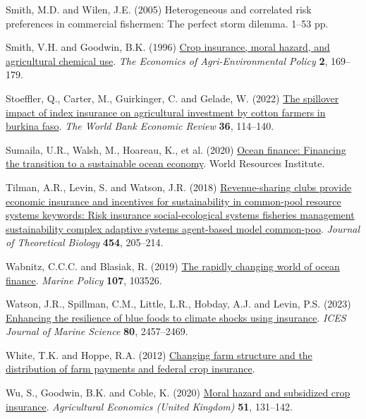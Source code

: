 \documentclass[
  letterpaper,
  DIV=11,
  numbers=noendperiod]{scrartcl}
\newlength{\cslhangindent}
\newenvironment{CSLReferences}[2] %
 {\begin{list}{}{%
  \setlength{\itemindent}{0pt}
  \setlength{\leftmargin}{0pt}
  \setlength{\parsep}{0pt}
  \ifodd #1
   \setlength{\leftmargin}{\cslhangindent}
   \setlength{\itemindent}{-1\cslhangindent}
  \fi
  \setlength{\itemsep}{#2\baselineskip}}}
 {\end{list}}
\theoremstyle{plain}
\theoremstyle{plain}
\theoremstyle{remark}
\begin{document}
\begin{CSLReferences}{1}{0}
Smith, M.D. and Wilen, J.E. (2005) Heterogeneous and correlated risk
preferences in commercial fishermen: The perfect storm dilemma. 1--53
pp.

Smith, V.H. and Goodwin, B.K. (1996)
\href{https://doi.org/10.2307/1243714}{Crop insurance, moral hazard, and
agricultural chemical use}. \emph{The Economics of Agri-Environmental
Policy} \textbf{2}, 169--179.

Stoeffler, Q., Carter, M., Guirkinger, C. and Gelade, W. (2022)
\href{https://doi.org/10.1093/wber}{The spillover impact of index
insurance on agricultural investment by cotton farmers in burkina faso}.
\emph{The World Bank Economic Review} \textbf{36}, 114--140.

Sumaila, U.R., Walsh, M., Hoareau, K., et al. (2020)
\href{https://www.oceanpanel.org/blue-}{Ocean finance: Financing the
transition to a sustainable ocean economy}. World Resources Institute.

Tilman, A.R., Levin, S. and Watson, J.R. (2018)
\href{https://doi.org/10.1016/j.jtbi.2018.06.003}{Revenue-sharing clubs
provide economic insurance and incentives for sustainability in
common-pool resource systems keywords: Risk insurance social-ecological
systems fisheries management sustainability complex adaptive systems
agent-based model common-poo}. \emph{Journal of Theoretical Biology}
\textbf{454}, 205--214.

Wabnitz, C.C.C. and Blasiak, R. (2019)
\href{https://doi.org/10.1016/j.marpol.2019.103526}{The rapidly changing
world of ocean finance}. \emph{Marine Policy} \textbf{107}, 103526.

Watson, J.R., Spillman, C.M., Little, L.R., Hobday, A.J. and Levin, P.S.
(2023) \href{https://doi.org/10.1093/icesjms/fsad175}{Enhancing the
resilience of blue foods to climate shocks using insurance}. \emph{ICES
Journal of Marine Science} \textbf{80}, 2457--2469.

White, T.K. and Hoppe, R.A. (2012)
\href{https://www.ers.usda.gov}{Changing farm structure and the
distribution of farm payments and federal crop insurance}.

Wu, S., Goodwin, B.K. and Coble, K. (2020)
\href{https://doi.org/10.1111/agec.12545}{Moral hazard and subsidized
crop insurance}. \emph{Agricultural Economics (United Kingdom)}
\textbf{51}, 131--142.

\end{CSLReferences}
\end{document}
